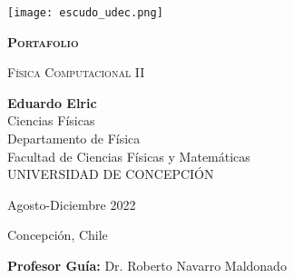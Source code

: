 \documentclass[../portafolio.tex]{subfiles}
\begin{document}


\begin{titlepage}
  
  
  \thispagestyle{frontpage}
  
  \begin{center}
    
    \texttt{[image: escudo\_udec.png]}
    
    
    \vspace*{3\baselineskip}

      \textsc{\Huge \textbf{Portafolio}}
      \vspace*{1.5\baselineskip}
      
      \textsc{\huge Física Computacional II}\\ %
      
      \vspace*{4\baselineskip}
      
      \large{\textbf{Eduardo Elric}}\\ 
      
      \large{Ciencias Físicas \\
        Departamento de Física \\
        Facultad de Ciencias Físicas y Matemáticas\\
        UNIVERSIDAD DE CONCEPCIÓN}
      
    
    \vspace{4\baselineskip}

    Agosto-Diciembre 2022

    \vspace{0.1\baselineskip}

    Concepción, Chile 

    \vspace{1.5\baselineskip}
    
    \large{\textbf{Profesor Guía:} Dr. Roberto Navarro Maldonado}\\
    
  \end{center}
  
  \vspace*{4\baselineskip}
  
  
\end{titlepage}
\end{document}
